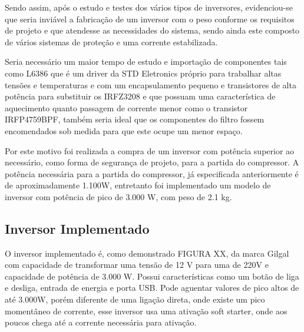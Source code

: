 Sendo assim, após o estudo e testes dos vários tipos de inversores, evidenciou-se que seria inviável a fabricação de um inversor com o peso conforme os requisitos de projeto e que atendesse as necessidades do sistema, sendo ainda este composto de vários sistemas de proteção e uma corrente estabilizada.

Seria necessário um maior tempo de estudo e importação de componentes tais como L6386 que é um driver da STD Eletronics próprio para trabalhar altas tensões e temperaturas e com um encapsulamento pequeno e transistores de alta potência para substituir os IRFZ3208 e que possuam uma característica de aquecimento quanto passagem de corrente menor como o transistor IRFP4759BPF, também seria ideal que os componentes do filtro fossem encomendados sob medida para que este ocupe um menor espaço.

Por este motivo foi realizada a compra de um inversor com potência superior ao necessário, como forma de segurança de projeto, para a partida do compressor. A potência necessária para a partida do compressor, já especificada anteriormente é de aproximadamente 1.100W, entretanto foi implementado um modelo de inversor com potência de pico de 3.000 W,  com peso de 2.1 kg.

\subsection{Inversor Implementado}
O inversor implementado é, como demonstrado FIGURA XX, da marca Gilgal com capacidade de transformar uma tensão de 12 V para uma de 220V e capacidade de potência de 3.000 W. Possui características como um botão de liga e desliga, entrada de energia e porta USB. Pode aguentar valores de pico altos de até 3.000W, porém diferente de uma ligação direta, onde existe um pico momentâneo de corrente, esse inversor usa uma ativação soft starter, onde aos poucos chega até a corrente necessária para ativação.	

